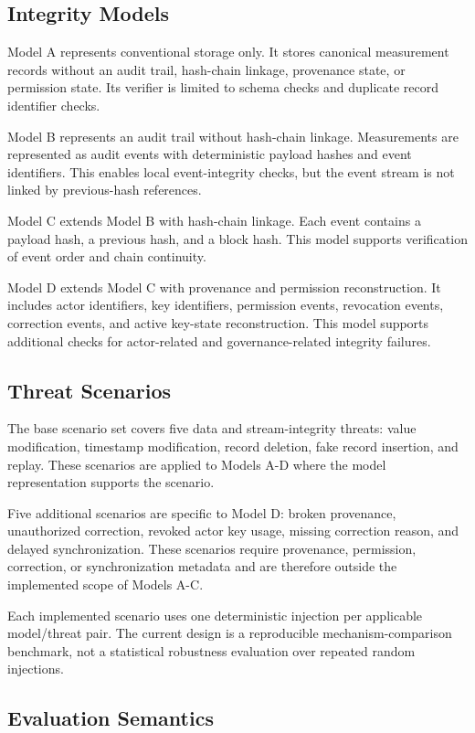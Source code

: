 \subsection{Integrity Models}

Model A represents conventional storage only. It stores canonical measurement records without an audit trail, hash-chain linkage, provenance state, or permission state. Its verifier is limited to schema checks and duplicate record identifier checks.

Model B represents an audit trail without hash-chain linkage. Measurements are represented as audit events with deterministic payload hashes and event identifiers. This enables local event-integrity checks, but the event stream is not linked by previous-hash references.

Model C extends Model B with hash-chain linkage. Each event contains a payload hash, a previous hash, and a block hash. This model supports verification of event order and chain continuity.

Model D extends Model C with provenance and permission reconstruction. It includes actor identifiers, key identifiers, permission events, revocation events, correction events, and active key-state reconstruction. This model supports additional checks for actor-related and governance-related integrity failures.

\subsection{Threat Scenarios}

The base scenario set covers five data and stream-integrity threats: value modification, timestamp modification, record deletion, fake record insertion, and replay. These scenarios are applied to Models A-D where the model representation supports the scenario.

Five additional scenarios are specific to Model D: broken provenance, unauthorized correction, revoked actor key usage, missing correction reason, and delayed synchronization. These scenarios require provenance, permission, correction, or synchronization metadata and are therefore outside the implemented scope of Models A-C.

Each implemented scenario uses one deterministic injection per applicable model/threat pair. The current design is a reproducible mechanism-comparison benchmark, not a statistical robustness evaluation over repeated random injections.

\subsection{Evaluation Semantics}

